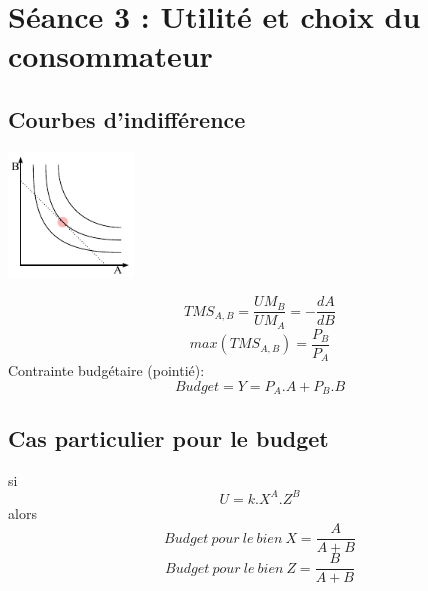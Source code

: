 \section{Séance 3 : Utilité et choix du consommateur}



\subsection{Courbes d'indifférence}
\begin{center}
	\includegraphics[width=0.25\textwidth]{images/graph_courbes_d_indifference.pdf}
\end{center}
$$TMS_{A,B}=\frac{UM_B}{UM_A}=-\frac{dA}{dB}$$
$$max(TMS_{A,B})=\frac{P_B}{P_A}$$
Contrainte budgétaire (pointié):
$$Budget=Y=P_A.A+P_B.B$$



\subsection{Cas particulier pour le budget}
si
$$U=k.X^A.Z^B$$
alors
$$Budget\ pour\ le\ bien\ X = \frac{A}{A+B}$$
$$Budget\ pour\ le\ bien\ Z = \frac{B}{A+B}$$



